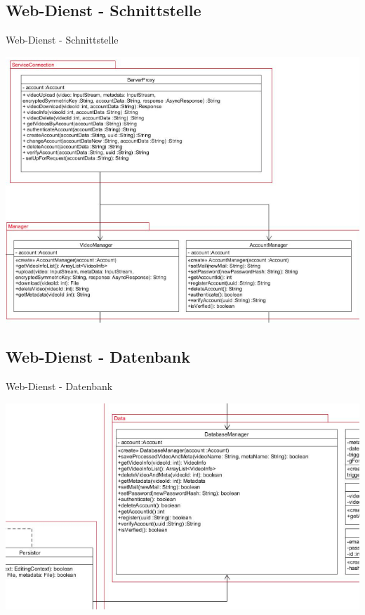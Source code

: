 \documentclass[19pt]{beamer}
\begin{document}
\subsection{Web-Dienst - Schnittstelle}
\begin{frame}{Web-Dienst - Schnittstelle}
\begin{center}
\includegraphics[scale=0.3]{resources/service_rest.png}
\end{center}
\end{frame}
\subsection{Web-Dienst - Datenbank}
\begin{frame}{Web-Dienst - Datenbank}
\begin{center}
\includegraphics[scale=0.35]{resources/service_db.png}
\end{center}
\end{frame}
\end{document}
